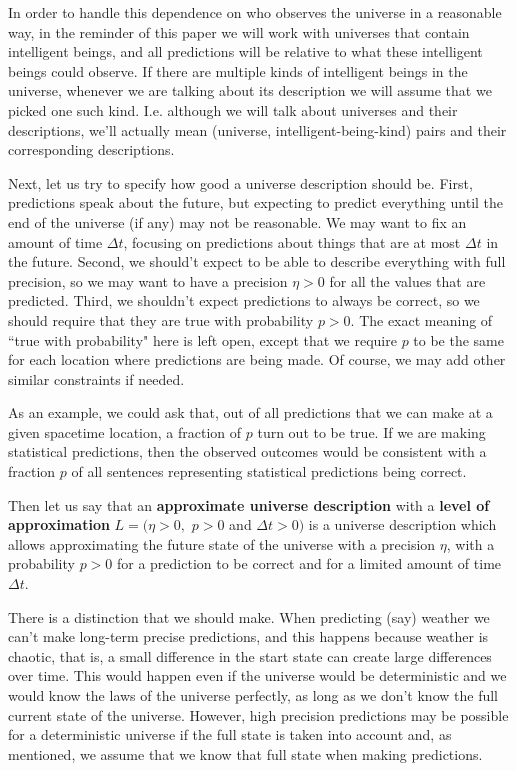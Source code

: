 \documentclass[a4paper
,draft
]{article}
\newcommand{\definitie}[1]{\textbf{#1}}
\newcommand{\ghilimele}[1]{``#1"}
\begin{document}
In order to handle this dependence on who observes the universe
in a reasonable way, in the reminder of this paper we will work with universes
that contain intelligent beings,
and all predictions will be relative to what these intelligent beings
could observe.
If there are multiple kinds of intelligent beings in the
universe, whenever we are talking about its description
we will assume that we picked one such kind.
I.e. although we
will talk about universes and their descriptions, we'll actually mean
(universe, intelligent-being-kind) pairs and their corresponding descriptions.

Next, let us try to specify how good a universe description
should be. First, predictions speak about the future, but expecting to
predict everything until the end of the universe (if any) may not be
reasonable. We may want to fix an amount of time $\Delta t$,
focusing on predictions about things that are at most
$\Delta t$ in the future. Second, we should't expect to
be able to describe everything with full precision, so we may want to
have a precision $\eta>0$ for all the values that are predicted.
Third, we shouldn't expect predictions to always be correct, so
we should require that they are true with probability $p>0$.
The exact meaning of \ghilimele{true with probability} here is left open,
except that we require $p$ to be the same for each location where
predictions are being made.
Of course, we may add other similar constraints if needed.

As an example, we could ask that, out of all predictions that we can make
at a given spacetime location, a fraction of $p$ turn out to be true.
If we are making
statistical predictions, then the observed outcomes would be consistent
with a fraction $p$ of all sentences representing statistical predictions
being correct.

Then let us say that an \definitie{approximate universe description} with a
\definitie{level of approximation} $L=(\eta>0,$ $p>0$ and $\Delta t>0)$
is a universe description which allows approximating the future
state of the universe with a precision $\eta$, with a probability
$p>0$ for a prediction to be correct
and for a limited amount of time $\Delta t$.

There is a distinction that we should make.
When predicting (say) weather we can't make long-term precise predictions,
and this happens because weather is chaotic, that is, a small difference
in the start state can create large differences over time.
This would happen even if the universe would be deterministic
and we would know the laws of the universe perfectly, as long as we don't know
the full current state of the universe.
However, high precision predictions may be possible for a deterministic
universe if the full state
is taken into account and, as mentioned, we assume that we know that full
state when making predictions.
\end{document}

